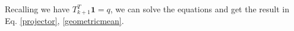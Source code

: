 \documentclass{article}
\theoremstyle{plain}
\theoremstyle{definition}
\begin{document}

Recalling we have $T_{k+1}^{T}\mathbf{1} = q$, we can solve the equations and get the result in Eq. \ref{projector}, \ref{geometricmean}.
\end{document}
